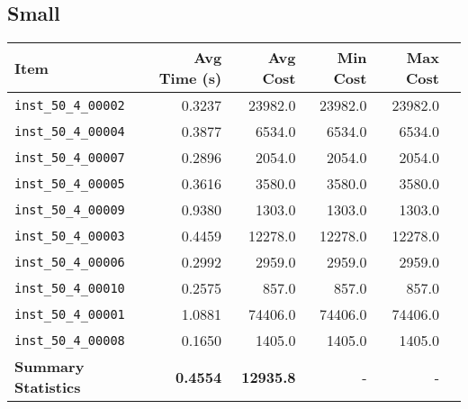 \documentclass{article}
\begin{document}
\subsection*{Small}

\begin{table}[H]
	\centering
	\begin{tabular}{lrrrrr}
		\toprule
		\textbf{Item} & \textbf{Avg Time (s)} & \textbf{Avg Cost} & \textbf{Min Cost} & \textbf{Max Cost}  \\
		\midrule
		\texttt{inst\_50\_4\_00002} & 0.3237 & 23982.0 & 23982.0 & 23982.0 \\ 
		\texttt{inst\_50\_4\_00004} & 0.3877 & 6534.0  & 6534.0  & 6534.0  \\ 
		\texttt{inst\_50\_4\_00007} & 0.2896 & 2054.0  & 2054.0  & 2054.0  \\ 
		\texttt{inst\_50\_4\_00005} & 0.3616 & 3580.0  & 3580.0  & 3580.0  \\ 
		\texttt{inst\_50\_4\_00009} & 0.9380 & 1303.0  & 1303.0  & 1303.0  \\ 
		\texttt{inst\_50\_4\_00003} & 0.4459 & 12278.0 & 12278.0 & 12278.0 \\ 
		\texttt{inst\_50\_4\_00006} & 0.2992 & 2959.0  & 2959.0  & 2959.0  \\ 
		\texttt{inst\_50\_4\_00010} & 0.2575 & 857.0   & 857.0   & 857.0   \\ 
		\texttt{inst\_50\_4\_00001} & 1.0881 & 74406.0 & 74406.0 & 74406.0 \\ 
		\texttt{inst\_50\_4\_00008} & 0.1650 & 1405.0  & 1405.0  & 1405.0  \\ 
		\midrule
		\textbf{Summary Statistics} & \textbf{0.4554} & \textbf{12935.8} & - & - \\
		\bottomrule
	\end{tabular}
	\label{tab:performance_metrics_small_vnd}
\end{table}
\end{document}
